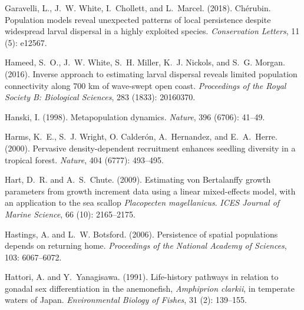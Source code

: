 \documentclass[12pt, oneside]{article}   	%
\begin{document}
\begin{thebibliography}{66}
Garavelli, L., J.~W. White, I.~Chollett, and L.~Marcel. (2018).
  Ch{\'e}rubin.
\newblock Population models reveal unexpected patterns of local persistence
  despite widespread larval dispersal in a highly exploited species.
\newblock \emph{Conservation Letters}, 11 (5): e12567.

Hameed, S.~O., J.~W. White, S.~H. Miller, K.~J. Nickols, and S.~G.
  Morgan. (2016).
\newblock Inverse approach to estimating larval dispersal reveals limited
  population connectivity along 700 km of wave-swept open coast.
\newblock \emph{Proceedings of the Royal Society B: Biological Sciences},
  283 (1833): 20160370.

Hanski, I. (1998).
\newblock Metapopulation dynamics.
\newblock \emph{Nature}, 396 (6706): 41--49.

Harms, K.~E., S.~J. Wright, O. Calder{\'o}n, A.~Hernandez, and
  E.~A.~Herre. (2000).
\newblock Pervasive density-dependent recruitment enhances seedling diversity
  in a tropical forest.
\newblock \emph{Nature}, 404 (6777): 493--495.

Hart, D.~R. and A.~S.~Chute. (2009).
\newblock Estimating von Bertalanffy growth parameters from growth increment
  data using a linear mixed-effects model, with an application to the sea
  scallop \textit{Placopecten magellanicus}.
\newblock \emph{ICES Journal of Marine Science}, 66 (10):
  2165--2175.

Hastings, A. and L.~W. Botsford. (2006).
\newblock Persistence of spatial populations depends on returning home.
\newblock \emph{Proceedings of the National Academy of Sciences}, 103:
  6067--6072.

Hattori, A. and Y.~Yanagisawa. (1991).
\newblock Life-history pathways in relation to gonadal sex differentiation in
  the anemonefish, \textit{Amphiprion clarkii}, in temperate waters of Japan.
\newblock \emph{Environmental Biology of Fishes}, 31 (2):
  139--155.


\end{thebibliography}
\end{document}
